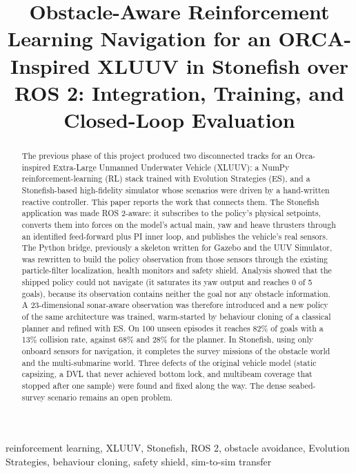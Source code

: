 \documentclass[conference]{IEEEtran}
\begin{document}
\title{Obstacle-Aware Reinforcement Learning Navigation for an ORCA-Inspired XLUUV in Stonefish over ROS 2: Integration, Training, and Closed-Loop Evaluation}
\author{ \and {} \and {} \and {} \and {}}
\maketitle
\begin{abstract}The previous phase of this project produced two disconnected tracks for an Orca-inspired Extra-Large Unmanned Underwater Vehicle (XLUUV): a NumPy reinforcement-learning (RL) stack trained with Evolution Strategies (ES), and a Stonefish-based high-fidelity simulator whose scenarios were driven by a hand-written reactive controller. This paper reports the work that connects them. The Stonefish application was made ROS 2-aware: it subscribes to the policy's physical setpoints, converts them into forces on the model's actual main, yaw and heave thrusters through an identified feed-forward plus PI inner loop, and publishes the vehicle's real sensors. The Python bridge, previously a skeleton written for Gazebo and the UUV Simulator, was rewritten to build the policy observation from those sensors through the existing particle-filter localization, health monitors and safety shield. Analysis showed that the shipped policy could not navigate (it saturates its yaw output and reaches 0 of 5 goals), because its observation contains neither the goal nor any obstacle information. A 23-dimensional sonar-aware observation was therefore introduced and a new policy of the same architecture was trained, warm-started by behaviour cloning of a classical planner and refined with ES. On 100 unseen episodes it reaches 82\% of goals with a 13\% collision rate, against 68\% and 28\% for the planner. In Stonefish, using only onboard sensors for navigation, it completes the survey missions of the obstacle world and the multi-submarine world. Three defects of the original vehicle model (static capsizing, a DVL that never achieved bottom lock, and multibeam coverage that stopped after one sample) were found and fixed along the way. The dense seabed-survey scenario remains an open problem.\end{abstract}
\begin{IEEEkeywords}reinforcement learning, XLUUV, Stonefish, ROS 2, obstacle avoidance, Evolution Strategies, behaviour cloning, safety shield, sim-to-sim transfer\end{IEEEkeywords}
\end{document}
